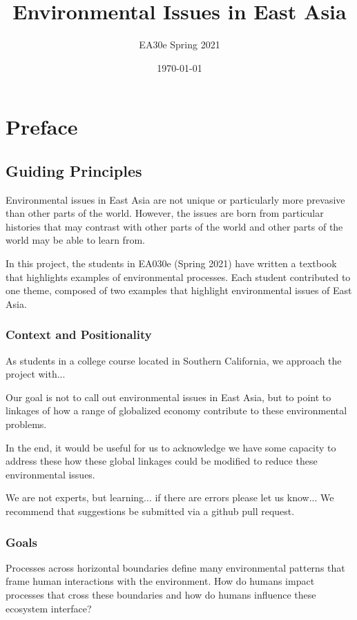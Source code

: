 \documentclass{book}\usepackage{knitr}
\title{Environmental Issues in East Asia}
\author{EA30e Spring 2021}
\date{\today}
\begin{document}
\makeglossaries
\maketitle


\frontmatter
\tableofcontents


\chapter*{Preface}

\section{Guiding Principles}

Environmental issues in East Asia are not unique or particularly more prevasive than other parts of the world. However, the issues are born from particular histories that may contrast with other parts of the world and other parts of the world may be able to learn from. 

In this project, the students in EA030e (Spring 2021) have written a textbook that highlights examples of environmental processes. Each student contributed to one theme, composed of two examples that highlight environmental issues of East Asia. 

\subsection{Context and Positionality}

As students in a college course located in Southern California, we approach the project with...


Our goal is not to call out environmental issues in East Asia, but to point to linkages of how a range of globalized economy contribute to these environmental problems. 

In the end, it would be useful for us to acknowledge we have some capacity to address these how these global linkages could be modified to reduce these environmental issues.

We are not experts, but learning... if there are errors please let us know... We recommend that suggestions be submitted via a github pull request.

\subsection{Goals}

Processes across horizontal boundaries define many environmental patterns that frame human interactions with the environment. How do humans impact processes that cross these boundaries and how do humans influence these ecosystem interface?
\end{document}
